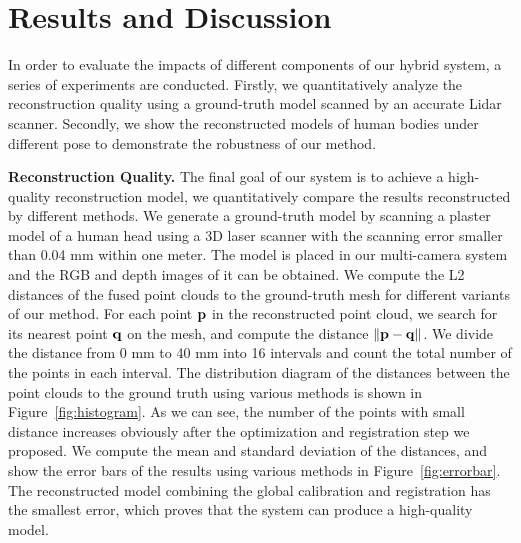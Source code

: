
\section{Results and Discussion}
\label{sec:Results}

In order to evaluate the impacts of different components of our hybrid system, a series of experiments are conducted. Firstly, we quantitatively analyze the reconstruction quality using a ground-truth model scanned by an accurate Lidar scanner.
Secondly, we show the reconstructed models of human bodies under different pose to demonstrate the robustness of our method.




\noindent\textbf{Reconstruction Quality.}
The final goal of our system is to achieve a high-quality reconstruction model, we quantitatively compare the results reconstructed by different methods.
%
We generate a ground-truth model by scanning a plaster model of a human head using a 3D laser scanner with the scanning error smaller than 0.04 mm within one meter.
%
The model is placed in our multi-camera system and the RGB and depth images of it can be obtained.
We compute the L2 distances of the fused point clouds to the ground-truth mesh for different variants of our method.
For each point $\mathbf{p}$ in the reconstructed point cloud, we search for its nearest point $\mathbf{q}$ on the mesh, and compute the distance $\|\mathbf{p}-\mathbf{q}\|$.
%
We divide the distance from 0 mm to 40 mm into 16 intervals and count the total number of the points in each interval. The distribution diagram of the distances between the point clouds to the ground truth using various methods is shown in Figure~\ref{fig:histogram}. As we can see, the number of the points with small distance increases obviously after the optimization and registration step we proposed. We compute the mean and standard deviation of the distances, and show the error bars of the results using various methods in Figure~\ref{fig:errorbar}. The reconstructed model combining the global calibration and registration has the smallest error, which proves that the system can produce a high-quality model.

